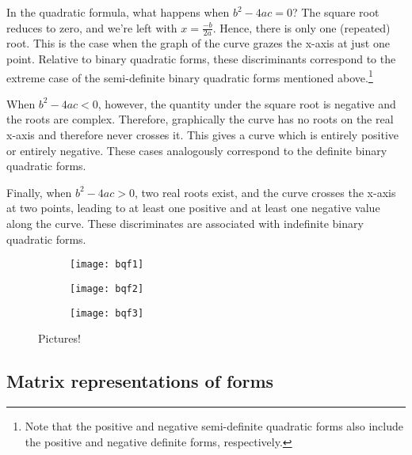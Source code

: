 \documentclass{article}
\theoremstyle{definition}
\theoremstyle{theorem}
\theoremstyle{example}
\theoremstyle{corollary}
\begin{document}
\bigskip

In the quadratic formula, what happens when \(b^{2} - 4ac = 0\)? The square root reduces to zero, and we're left with \(x = \frac{-b}{2a}\). Hence, there is only one (repeated) root. This is the case when the graph of the curve grazes the x-axis at just one point. Relative to binary quadratic forms, these discriminants correspond to the extreme case of the semi-definite binary quadratic forms mentioned above.\footnote{Note that the positive and negative semi-definite quadratic forms also include the positive and negative definite forms, respectively.}

\bigskip

When \(b^{2} - 4ac < 0\), however, the quantity under the square root is negative and the roots are complex. Therefore, graphically the curve has no roots on the real x-axis and therefore never crosses it. This gives a curve which is entirely positive or entirely negative. These cases analogously correspond to the definite binary quadratic forms.

\bigskip

Finally, when \(b^{2} - 4ac > 0\), two real roots exist, and the curve crosses the x-axis at two points, leading to at least one positive and at least one negative value along the curve. These discriminates are associated with indefinite binary quadratic forms.

\bigskip

\begin{figure}[H]
    \centering
    \begin{subfigure}
        \centering
        \texttt{[image: bqf1]}
    \end{subfigure}
    \begin{subfigure}
        \centering
        \texttt{[image: bqf2]}
    \end{subfigure}
    \begin{subfigure}
        \centering
        \texttt{[image: bqf3]}
    \end{subfigure}    
    \caption{Pictures!}
\end{figure}







\bigskip

\subsection{Matrix representations of forms}
\end{document}
